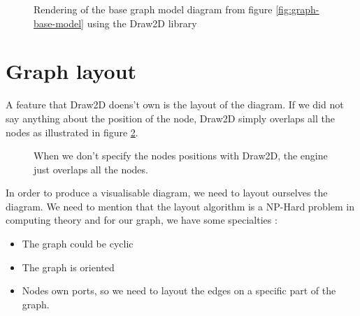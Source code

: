 \begin{figure}[H]
  \centering
  \caption[Render of the base graph model using the Draw2D library]{Rendering of
    the base graph model diagram from figure \ref{fig:graph-base-model} using
    the Draw2D library}
  \label{fig:base-graph-model-html-draw2d}
\end{figure}

\section{Graph layout}
\label{sec:graph-layout}

A feature that Draw2D doens't own is the layout of the diagram. If we did not
say anything about the position of the node, Draw2D simply overlaps all the nodes
 as illustrated in figure \ref{fig:draw2d_overlapping}.

\begin{figure}[H]
  \centering
  \caption[Overlapping of nodes by Draw2D]{When we don't specify the
    nodes positions with Draw2D, the engine just overlaps all the nodes.}
  \label{fig:draw2d_overlapping}
\end{figure}

In order to produce a visualisable diagram, we need to layout ourselves the
diagram. We need to mention that the layout algorithm is a NP-Hard problem in
computing theory\cite{Tamassia:2007:HGD:1202383} and for our graph, we have some
specialties :

\begin{itemize}
\item The graph could be cyclic
\item The graph is oriented
\item Nodes own ports, so we need to layout the edges on a specific part of the graph.
\end{itemize}

